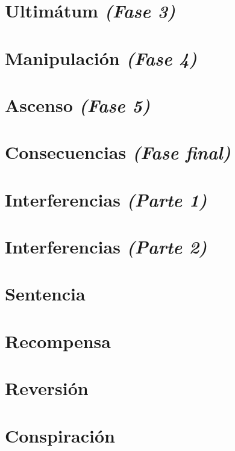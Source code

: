 \documentclass[11pt]{book}
\begin{document}
\chapter{Ultimátum \emph{\mdseries(Fase 3)}}


\chapter{Manipulación \emph{\mdseries(Fase 4)}}


\chapter{Ascenso \emph{\mdseries(Fase 5)}}


\chapter{Consecuencias \emph{\mdseries(Fase final)}}


\chapter{Interferencias \emph{\mdseries(Parte 1)}}


\chapter{Interferencias \emph{\mdseries(Parte 2)}}


\chapter{Sentencia}


\chapter{Recompensa}


\chapter{Reversión}


\chapter{Conspiración}

\end{document}

